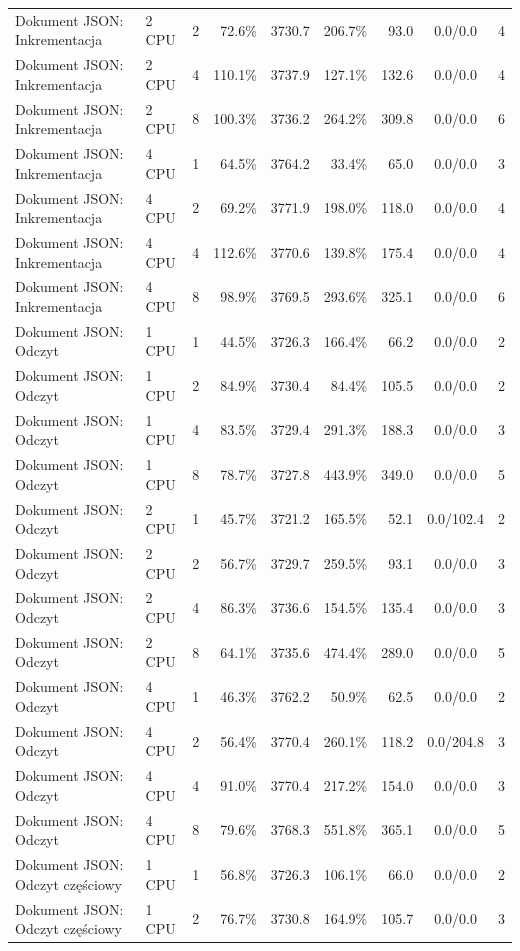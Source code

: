 \begin{table}[ht]
{\begin{tabular}{llcrrrrcc}
Dokument JSON: Inkrementacja & 2 CPU & 2 & 72.6\% & 3730.7 & 206.7\% & 93.0 & 0.0/0.0 & 4 \\
Dokument JSON: Inkrementacja & 2 CPU & 4 & 110.1\% & 3737.9 & 127.1\% & 132.6 & 0.0/0.0 & 4 \\
Dokument JSON: Inkrementacja & 2 CPU & 8 & 100.3\% & 3736.2 & 264.2\% & 309.8 & 0.0/0.0 & 6 \\
Dokument JSON: Inkrementacja & 4 CPU & 1 & 64.5\% & 3764.2 & 33.4\% & 65.0 & 0.0/0.0 & 3 \\
Dokument JSON: Inkrementacja & 4 CPU & 2 & 69.2\% & 3771.9 & 198.0\% & 118.0 & 0.0/0.0 & 4 \\
Dokument JSON: Inkrementacja & 4 CPU & 4 & 112.6\% & 3770.6 & 139.8\% & 175.4 & 0.0/0.0 & 4 \\
Dokument JSON: Inkrementacja & 4 CPU & 8 & 98.9\% & 3769.5 & 293.6\% & 325.1 & 0.0/0.0 & 6 \\
Dokument JSON: Odczyt & 1 CPU & 1 & 44.5\% & 3726.3 & 166.4\% & 66.2 & 0.0/0.0 & 2 \\
Dokument JSON: Odczyt & 1 CPU & 2 & 84.9\% & 3730.4 & 84.4\% & 105.5 & 0.0/0.0 & 2 \\
Dokument JSON: Odczyt & 1 CPU & 4 & 83.5\% & 3729.4 & 291.3\% & 188.3 & 0.0/0.0 & 3 \\
Dokument JSON: Odczyt & 1 CPU & 8 & 78.7\% & 3727.8 & 443.9\% & 349.0 & 0.0/0.0 & 5 \\
Dokument JSON: Odczyt & 2 CPU & 1 & 45.7\% & 3721.2 & 165.5\% & 52.1 & 0.0/102.4 & 2 \\
Dokument JSON: Odczyt & 2 CPU & 2 & 56.7\% & 3729.7 & 259.5\% & 93.1 & 0.0/0.0 & 3 \\
Dokument JSON: Odczyt & 2 CPU & 4 & 86.3\% & 3736.6 & 154.5\% & 135.4 & 0.0/0.0 & 3 \\
Dokument JSON: Odczyt & 2 CPU & 8 & 64.1\% & 3735.6 & 474.4\% & 289.0 & 0.0/0.0 & 5 \\
Dokument JSON: Odczyt & 4 CPU & 1 & 46.3\% & 3762.2 & 50.9\% & 62.5 & 0.0/0.0 & 2 \\
Dokument JSON: Odczyt & 4 CPU & 2 & 56.4\% & 3770.4 & 260.1\% & 118.2 & 0.0/204.8 & 3 \\
Dokument JSON: Odczyt & 4 CPU & 4 & 91.0\% & 3770.4 & 217.2\% & 154.0 & 0.0/0.0 & 3 \\
Dokument JSON: Odczyt & 4 CPU & 8 & 79.6\% & 3768.3 & 551.8\% & 365.1 & 0.0/0.0 & 5 \\
Dokument JSON: Odczyt częściowy & 1 CPU & 1 & 56.8\% & 3726.3 & 106.1\% & 66.0 & 0.0/0.0 & 2 \\
Dokument JSON: Odczyt częściowy & 1 CPU & 2 & 76.7\% & 3730.8 & 164.9\% & 105.7 & 0.0/0.0 & 3 \\

\end{tabular}}
\end{table}
